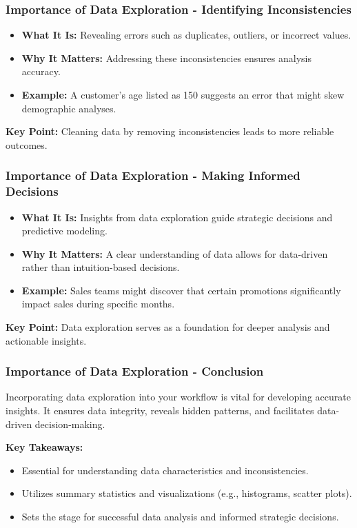 \documentclass[aspectratio=169]{beamer}
\begin{document}
\begin{frame}[fragile]
    \frametitle{Importance of Data Exploration - Identifying Inconsistencies}
    \begin{itemize}
        \item \textbf{What It Is:} Revealing errors such as duplicates, outliers, or incorrect values.
        \item \textbf{Why It Matters:} Addressing these inconsistencies ensures analysis accuracy.
        \item \textbf{Example:} A customer's age listed as 150 suggests an error that might skew demographic analyses.
    \end{itemize}
    
    \textbf{Key Point:} Cleaning data by removing inconsistencies leads to more reliable outcomes.
\end{frame}

\begin{frame}[fragile]
    \frametitle{Importance of Data Exploration - Making Informed Decisions}
    \begin{itemize}
        \item \textbf{What It Is:} Insights from data exploration guide strategic decisions and predictive modeling.
        \item \textbf{Why It Matters:} A clear understanding of data allows for data-driven rather than intuition-based decisions.
        \item \textbf{Example:} Sales teams might discover that certain promotions significantly impact sales during specific months.
    \end{itemize}

    \textbf{Key Point:} Data exploration serves as a foundation for deeper analysis and actionable insights.
\end{frame}

\begin{frame}[fragile]
    \frametitle{Importance of Data Exploration - Conclusion}
    Incorporating data exploration into your workflow is vital for developing accurate insights. It ensures data integrity, reveals hidden patterns, and facilitates data-driven decision-making. 

    \textbf{Key Takeaways:}
    \begin{itemize}
        \item Essential for understanding data characteristics and inconsistencies.
        \item Utilizes summary statistics and visualizations (e.g., histograms, scatter plots).
        \item Sets the stage for successful data analysis and informed strategic decisions.
    \end{itemize}
\end{frame}
\end{document}
